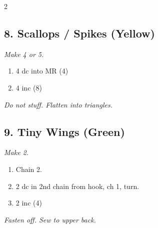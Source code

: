 \begin{multicols}{2}
\subsection*{8. Scallops / Spikes (Yellow)}
\textit{Make 4 or 5.}
\begin{enumerate}[noitemsep,leftmargin=*]
    \item 4 dc into MR (4)
    \item 4 inc (8)
\end{enumerate}
\textit{Do not stuff. Flatten into triangles.}

\subsection*{9. Tiny Wings (Green)}
\textit{Make 2.}
\begin{enumerate}[noitemsep,leftmargin=*]
    \item Chain 2.
    \item 2 dc in 2nd chain from hook, ch 1, turn.
    \item 2 inc (4)
\end{enumerate}
\textit{Fasten off. Sew to upper back.}

\end{multicols}
